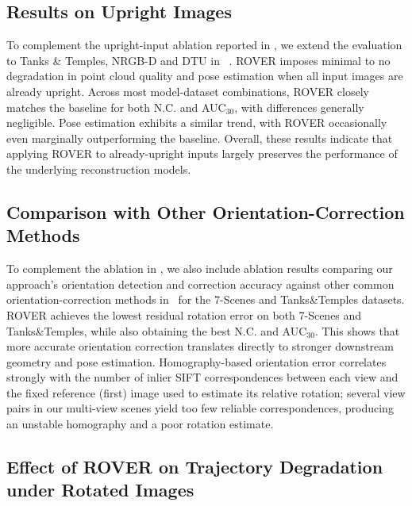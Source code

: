 \subsection{Results on Upright Images}
\label{sec:allupright_suppl}


To complement the upright-input ablation reported in , we extend the evaluation to Tanks \& Temples, NRGB-D and DTU in ~. ROVER imposes minimal to no degradation in point cloud quality and pose estimation when all input images are already upright. Across most model-dataset combinations, ROVER closely matches the baseline for both N.C. and AUC$_{30}$, with differences generally negligible. Pose estimation exhibits a similar trend, with ROVER occasionally even marginally outperforming the baseline. Overall, these results indicate that applying ROVER to already-upright inputs largely preserves the performance of the underlying reconstruction models.

\subsection{Comparison with Other Orientation-Correction Methods}

To complement the ablation in , we also include ablation results comparing our approach's orientation detection and correction accuracy against other common orientation-correction methods in~ for the 7-Scenes and Tanks\&Temples datasets. ROVER achieves the lowest residual rotation error on both 7-Scenes and Tanks\&Temples, while also obtaining the best N.C. and AUC$_{30}$. This shows that more accurate orientation correction translates directly to stronger downstream geometry and pose estimation. Homography-based orientation error correlates strongly with the number of inlier SIFT correspondences between each view and the fixed reference (first) image used to estimate its relative rotation; several view pairs in our multi-view scenes yield too few reliable correspondences, producing an unstable homography and a poor rotation estimate.


\subsection{Effect of ROVER on Trajectory Degradation under Rotated Images}

